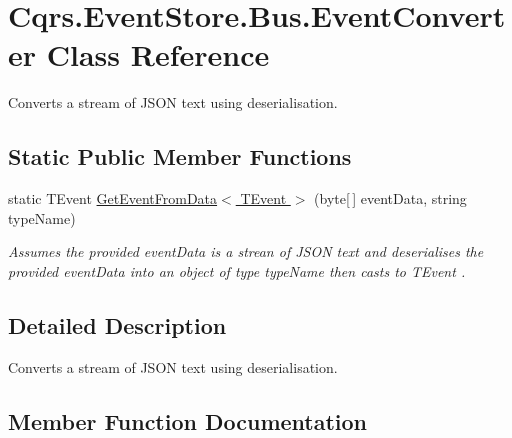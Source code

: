 \hypertarget{classCqrs_1_1EventStore_1_1Bus_1_1EventConverter}{}\section{Cqrs.\+Event\+Store.\+Bus.\+Event\+Converter Class Reference}
\label{classCqrs_1_1EventStore_1_1Bus_1_1EventConverter}


Converts a stream of J\+S\+ON text using deserialisation.  


\subsection*{Static Public Member Functions}
\begin{DoxyCompactItemize}
\item 
static T\+Event \hyperlink{classCqrs_1_1EventStore_1_1Bus_1_1EventConverter_a22d7d8455731564574dc9684c272e6d2_a22d7d8455731564574dc9684c272e6d2}{Get\+Event\+From\+Data$<$ T\+Event $>$} (byte\mbox{[}$\,$\mbox{]} event\+Data, string type\+Name)
\begin{DoxyCompactList}\small\item\em Assumes the provided {\itshape event\+Data}  is a strean of J\+S\+ON text and deserialises the provided {\itshape event\+Data}  into an object of type {\itshape type\+Name}  then casts to {\itshape T\+Event} . \end{DoxyCompactList}\end{DoxyCompactItemize}


\subsection{Detailed Description}
Converts a stream of J\+S\+ON text using deserialisation. 



\subsection{Member Function Documentation}
\mbox{\label{classCqrs_1_1EventStore_1_1Bus_1_1EventConverter_a22d7d8455731564574dc9684c272e6d2_a22d7d8455731564574dc9684c272e6d2}} 

